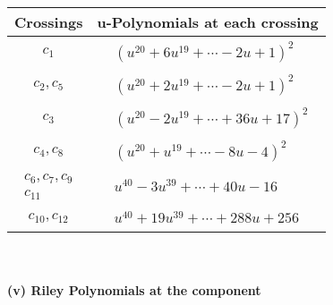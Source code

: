 \documentclass[1p]{elsarticle_modified}
\theoremstyle{definition}
\begin{document}
\begin{tabular}{m{50pt}|m{274pt}}
Crossings & \hspace{64pt}u-Polynomials at each crossing \\
\hline $$\begin{aligned}c_{1}\end{aligned}$$&$\begin{aligned}
&(u^{20}+6 u^{19}+\cdots-2 u+1)^{2}
\end{aligned}$\\
\hline $$\begin{aligned}c_{2},c_{5}\end{aligned}$$&$\begin{aligned}
&(u^{20}+2 u^{19}+\cdots-2 u+1)^{2}
\end{aligned}$\\
\hline $$\begin{aligned}c_{3}\end{aligned}$$&$\begin{aligned}
&(u^{20}-2 u^{19}+\cdots+36 u+17)^{2}
\end{aligned}$\\
\hline $$\begin{aligned}c_{4},c_{8}\end{aligned}$$&$\begin{aligned}
&(u^{20}+u^{19}+\cdots-8 u-4)^{2}
\end{aligned}$\\
\hline $$\begin{aligned}c_{6},c_{7},c_{9}\\c_{11}\end{aligned}$$&$\begin{aligned}
&u^{40}-3 u^{39}+\cdots+40 u-16
\end{aligned}$\\
\hline $$\begin{aligned}c_{10},c_{12}\end{aligned}$$&$\begin{aligned}
&u^{40}+19 u^{39}+\cdots+288 u+256
\end{aligned}$\\
\hline
\end{tabular}\\~\\
\newpage\renewcommand{\arraystretch}{1}
\flushleft \textbf{(v) Riley Polynomials at the component}\newline \\
\end{document}
